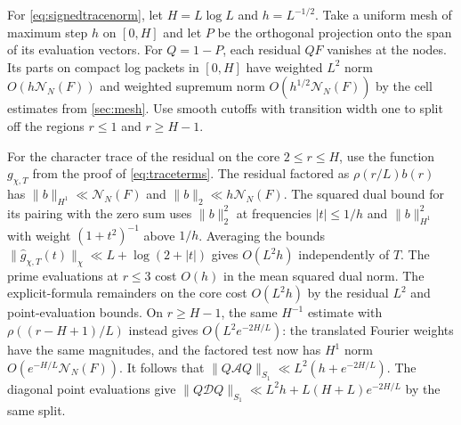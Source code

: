 \documentclass[11pt,a4paper]{article}
\numberwithin{equation}{section}
\newcommand{\NN}{\mathcal N_N}
\begin{document}
For \cref{eq:signedtracenorm}, let $H=L\log L$ and
$h=L^{-1/2}$. Take a uniform mesh of maximum step $h$
on $[0,H]$ and let $P$ be the orthogonal projection
onto the span of its evaluation vectors. For $Q=1-P$,
each residual $QF$ vanishes at the nodes. Its parts on
compact log packets in $[0,H]$ have weighted $L^2$ norm
$O(h\NN(F))$ and weighted supremum norm
$O(h^{1/2}\NN(F))$ by the cell estimates from
\cref{sec:mesh}. Use smooth cutoffs with transition
width one to split off the regions $r\le1$ and
$r\ge H-1$.

For the character trace of the residual on the core
$2\le r\le H$, use the function $g_{\chi,T}$ from
the proof of \cref{eq:traceterms}. The residual
factored as $\rho(r/L)b(r)$ has
$\|b\|_{H^1}\ll\NN(F)$ and $\|b\|_2\ll h\NN(F)$.
The squared dual bound for its pairing with the zero
sum uses $\|b\|_2^2$ at frequencies $|t|\le1/h$ and
$\|b\|_{H^1}^2$ with weight $(1+t^2)^{-1}$ above
$1/h$. Averaging the bounds
$\|\widehat g_{\chi,T}(t)\|_\chi\ll L+\log(2+|t|)$
gives $O(L^2h)$ independently of $T$.
The prime evaluations at $r\le3$ cost $O(h)$ in the
mean squared dual norm. The explicit-formula remainders
on the core cost $O(L^2 h)$ by the residual $L^2$
and point-evaluation bounds. On $r\ge H-1$, the same
$H^{-1}$ estimate with $\rho((r-H+1)/L)$ instead gives
$O(L^2e^{-2H/L})$: the translated Fourier weights
have the same magnitudes, and the factored test now
has $H^1$ norm $O(e^{-H/L}\NN(F))$.
It follows that
$\|Q\mathcal A Q\|_{S_1}\ll L^2(h+e^{-2H/L})$.
The diagonal point evaluations give
$\|Q\mathcal D Q\|_{S_1}\ll L^2h+L(H+L)e^{-2H/L}$
by the same split.
\end{document}
